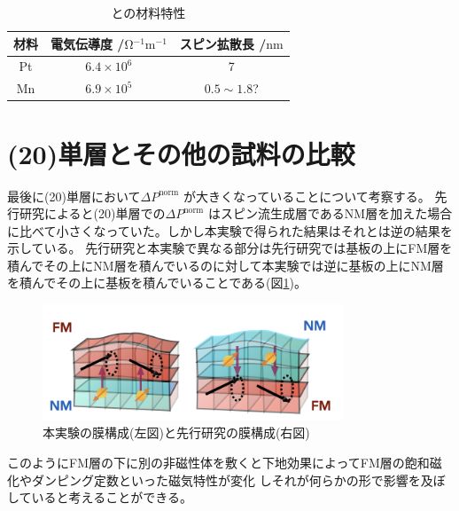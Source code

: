 \documentclass[dvipdfmx,11pt]{jsreport}
\numberwithin{equation}{chapter}
\numberwithin{table}{chapter}
\begin{document}
\begin{table}[H]
	\centering
	\caption{との材料特性}
	\label{tab:mnpt}
	\begin{tabular}{c|c|c}\hline \hline
	 材料&電気伝導度 /$\si{\ohm^{-1}\metre ^{-1}}$ &スピン拡散長 /$\si{\nano \metre}$\\ \hline
	 Pt&$6.4\times 10^{6}$ \cite{PhysRevLett.101.036601}&7\cite{PhysRevLett.101.036601}\\ \hline
	 Mn&$6.9\times 10^{5}$&$0.5\sim 1.8$?\cite{PhysRevLett.113.196602} \\ \hline \hline
	\end{tabular}
\end{table}


\section{(20)単層とその他の試料の比較}
最後に(20)単層において$\Delta P^{\text{norm}}$ が大きくなっていることについて考察する。
先行研究\cite{ku}によると(20)単層での$\Delta P^{\text{norm}}$ はスピン流生成層であるNM層を加えた場合に比べて小さくなっていた。しかし本実験で得られた結果はそれとは逆の結果を示している。
先行研究と本実験で異なる部分は先行研究では基板の上にFM層を積んでその上にNM層を積んでいるのに対して本実験では逆に基板の上にNM層を積んでその上に基板を積んでいることである(図\ref{fig:efig-e1-png})。

\begin{figure}[H]
	\centering
	\includegraphics[width=0.8\textwidth]{efig/e1.png}
	\caption{本実験の膜構成(左図)と先行研究\cite{ku}の膜構成(右図)}
	\label{fig:efig-e1-png}
\end{figure}
このようにFM層の下に別の非磁性体を敷くと下地効果\cite{HAN2022164298}によってFM層の飽和磁化やダンピング定数といった磁気特性が変化
しそれが何らかの形で影響を及ぼしていると考えることができる。
\end{document}

